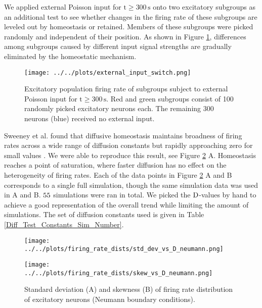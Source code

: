 \documentclass[10pt,a4paper]{article}
\begin{document}
We applied external Poisson input for $\mathrm{t\geq 300\, s}$ onto two excitatory subgroups as an additional test to see whether changes in the firing rate of these subgroups are leveled out by homeostasis or retained. Members of these subgroups were picked randomly and independent of their position. As shown in Figure \ref{Ext_Input_Switch}, differences among subgroups caused by different input signal strengths are gradually eliminated by the homeostatic mechanism.
\begin{figure}
\begin{center}
\texttt{[image: ../../plots/external\_input\_switch.png]}
\end{center}
\caption[Excitatory population firing rate of subgroups subject to external Poisson input]{Excitatory population firing rate of subgroups subject to external Poisson input for $\mathrm{t\geq 300\, s}$. Red and green subgroups consist of 100 randomly picked excitatory neurons each. The remaining 300 neurons (blue) received no external input.}
\label{Ext_Input_Switch}
\end{figure}

Sweeney et al. found that diffusive homeostasis maintains broadness of firing rates across a wide range of diffusion constants but rapidly approaching zero for small values \cite[p. 6]{Sweeney_Paper}. We were able to reproduce this result, see Figure \ref{Fir_Rate_Dist_Width_Skewness_vs_D} A. Homeostasis reaches a point of saturation, where faster diffusion has no effect on the heterogeneity of firing rates. Each of the data points in Figure \ref{Fir_Rate_Dist_Width_Skewness_vs_D} A and B corresponds to a single full simulation, though the same simulation data was used in A and B. $\rm 55$ simulations were ran in total. We picked the $\rm D$-values by hand to achieve a good representation of the overall trend while limiting the amount of simulations. The set of diffusion constants used is given in Table \ref{Diff_Test_Constants_Sim_Number}.
\begin{figure}
\begin{minipage}{0.5\textwidth}
\texttt{[image: ../../plots/firing\_rate\_dists/std\_dev\_vs\_D\_neumann.png]}
\end{minipage}
\begin{minipage}{0.5\textwidth}
\texttt{[image: ../../plots/firing\_rate\_dists/skew\_vs\_D\_neumann.png]}
\end{minipage}
\caption[Standard deviation and skewness of firing rate distribution of excitatory neurons]{Standard deviation (A) and skewness (B) of firing rate distribution of excitatory neurons (Neumann boundary conditions).}
\label{Fir_Rate_Dist_Width_Skewness_vs_D}
\end{figure}
\end{document}
